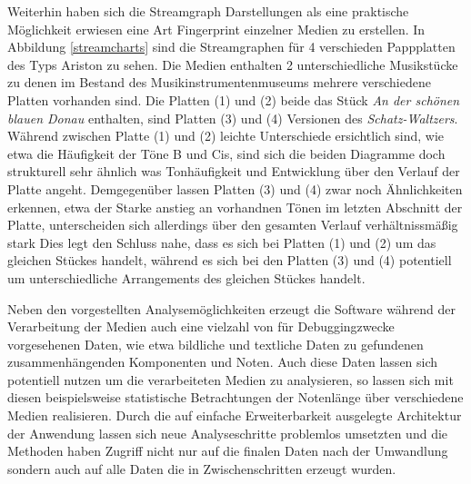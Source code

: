 Weiterhin haben sich die Streamgraph Darstellungen als eine praktische Möglichkeit erwiesen eine Art Fingerprint einzelner Medien zu erstellen.
In Abbildung \ref{streamcharts} sind die Streamgraphen für 4 verschieden Pappplatten des Typs Ariston zu sehen.
Die Medien enthalten 2 unterschiedliche Musikstücke zu denen im Bestand des Musikinstrumentenmuseums mehrere verschiedene Platten vorhanden sind.
Die Platten (1) und (2) beide das Stück \textit{An der schönen blauen Donau} enthalten, sind Platten (3) und (4) Versionen des \textit{Schatz-Waltzers}.
Während zwischen Platte (1) und (2) leichte Unterschiede ersichtlich sind, wie etwa die Häufigkeit der Töne B und Cis, sind sich die beiden Diagramme doch strukturell sehr ähnlich was Tonhäufigkeit und Entwicklung über den Verlauf der Platte angeht.
Demgegenüber lassen Platten (3) und (4) zwar noch Ähnlichkeiten erkennen, etwa der Starke anstieg an vorhandnen Tönen im letzten Abschnitt der Platte, unterscheiden sich allerdings über den gesamten Verlauf verhältnissmäßig stark
Dies legt den Schluss nahe, dass es sich bei Platten (1) und (2) um das gleichen Stückes handelt, während es sich bei den Platten (3) und (4) potentiell um unterschiedliche Arrangements des gleichen Stückes handelt.

Neben den vorgestellten Analysemöglichkeiten erzeugt die Software während der Verarbeitung der Medien auch eine vielzahl von für Debuggingzwecke vorgesehenen Daten, wie etwa bildliche und textliche Daten zu gefundenen zusammenhängenden Komponenten und Noten.
Auch diese Daten lassen sich potentiell nutzen um die verarbeiteten Medien zu analysieren, so lassen sich mit diesen beispielsweise statistische Betrachtungen der Notenlänge über verschiedene Medien realisieren.
Durch die auf einfache Erweiterbarkeit ausgelegte Architektur der Anwendung lassen sich neue Analyseschritte problemlos umsetzten und die Methoden haben Zugriff nicht nur auf die finalen Daten nach der Umwandlung sondern auch auf alle Daten die in Zwischenschritten erzeugt wurden.